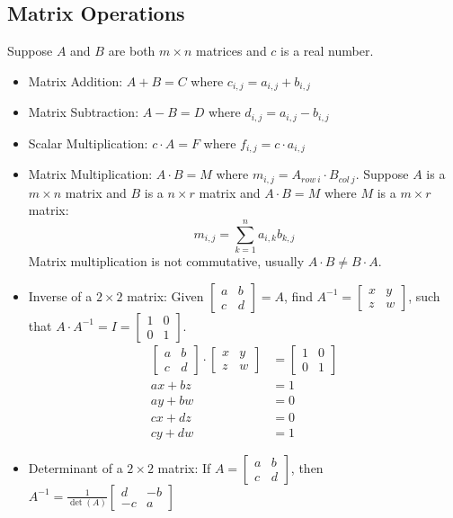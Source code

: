 \documentclass[letterpaper, 12pt]{math}
\begin{document}
\subsection*{Matrix Operations}
Suppose \( A \) and \( B \) are both \( m\times n \) matrices and \( c \) is
a real number.
\begin{itemize}
  \item Matrix Addition: \( A+B = C \) where \( c_{i,j} = a_{i,j}+b_{i,j} \)
  \item Matrix Subtraction: \( A-B = D \) where \( d_{i,j} = a_{i,j}-b_{i,j} \)
  \item Scalar Multiplication: \( c\cdot A = F \) where \( f_{i,j} = c\cdot
    a_{i,j} \)
  \item Matrix Multiplication: \( A\cdot B = M \) where \( m_{i,j} = A_{row\ i}
    \cdot B_{col\ j} \). Suppose \( A \) is a \( m\times n \) matrix and \( B \)
    is a \( n\times r \) matrix and \( A\cdot B = M \) where \( M \) is a
    \( m\times r \) matrix:
    \[ m_{i,j} = \sum_{k=1}^{n}a_{i,k}b_{k,j} \]
    Matrix multiplication is not commutative, usually
    \( A\cdot B\neq B\cdot A \).
  \item Inverse of a \( 2\times2 \) matrix:
    Given \( \begin{bmatrix} a & b \\ c & d \end{bmatrix} = A \), find
    \( A^{-1} = \begin{bmatrix} x & y \\ z & w \end{bmatrix} \), such that
    \( A\cdot A^{-1} = I = \begin{bmatrix} 1 & 0 \\ 0 & 1 \end{bmatrix} \).
    \begin{align*}
      \begin{bmatrix} a & b \\ c & d \end{bmatrix}\cdot
      \begin{bmatrix} x & y \\ z & w \end{bmatrix} &=
      \begin{bmatrix} 1 & 0 \\ 0 & 1 \end{bmatrix} \\
      ax+bz &= 1 \\
      ay+bw &= 0 \\
      cx+dz &= 0 \\
      cy+dw &= 1
    \end{align*}
  \item Determinant of a \( 2\times2 \) matrix: If \( A = \begin{bmatrix} a & b
    \\ c & d \end{bmatrix} \), then \( A^{-1} = \frac{1}{\det(A)}
    \begin{bmatrix} d & -b \\ -c & a \end{bmatrix} \)
\end{itemize}
\end{document}
